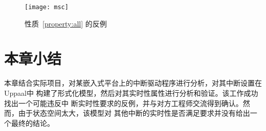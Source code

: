 \begin{figure}[H]
	\centering
	\texttt{[image: msc]}
	\caption{性质~\ref{property:all} 的反例}
	\label{fig:exp_counter}
\end{figure}

\section{本章小结}
\label{sec:sum_4}

本章结合实际项目，对某嵌入式平台上的中断驱动程序进行分析，对其中断设置在Uppaal中
构建了形式化模型，然后对其实时性属性进行分析和验证。该工作成功找出一个可能违反中
断实时性要求的反例，并与对方工程师交流得到确认。然而，由于状态空间太大，该模型对
其他中断的实时性是否满足要求并没有给出一个最终的结论。